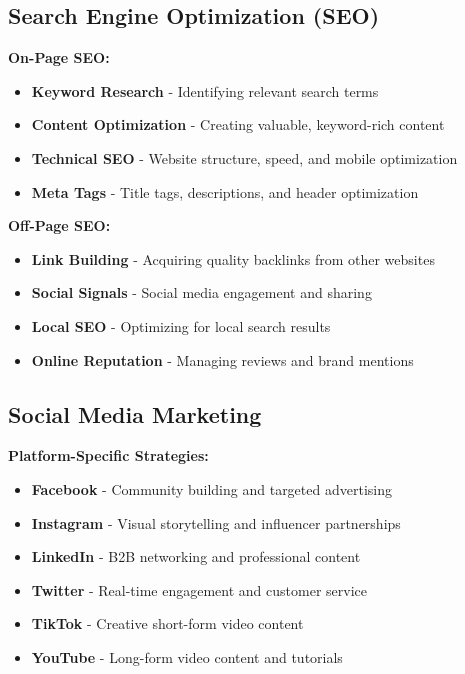 \documentclass[12pt]{article}
\begin{document}
\subsection{Search Engine Optimization (SEO)}

\textbf{On-Page SEO:}
\begin{itemize}
    \item \textbf{Keyword Research} - Identifying relevant search terms
    \item \textbf{Content Optimization} - Creating valuable, keyword-rich content
    \item \textbf{Technical SEO} - Website structure, speed, and mobile optimization
    \item \textbf{Meta Tags} - Title tags, descriptions, and header optimization
\end{itemize}

\textbf{Off-Page SEO:}
\begin{itemize}
    \item \textbf{Link Building} - Acquiring quality backlinks from other websites
    \item \textbf{Social Signals} - Social media engagement and sharing
    \item \textbf{Local SEO} - Optimizing for local search results
    \item \textbf{Online Reputation} - Managing reviews and brand mentions
\end{itemize}

\subsection{Social Media Marketing}

\textbf{Platform-Specific Strategies:}
\begin{itemize}
    \item \textbf{Facebook} - Community building and targeted advertising
    \item \textbf{Instagram} - Visual storytelling and influencer partnerships
    \item \textbf{LinkedIn} - B2B networking and professional content
    \item \textbf{Twitter} - Real-time engagement and customer service
    \item \textbf{TikTok} - Creative short-form video content
    \item \textbf{YouTube} - Long-form video content and tutorials
\end{itemize}
\end{document}
